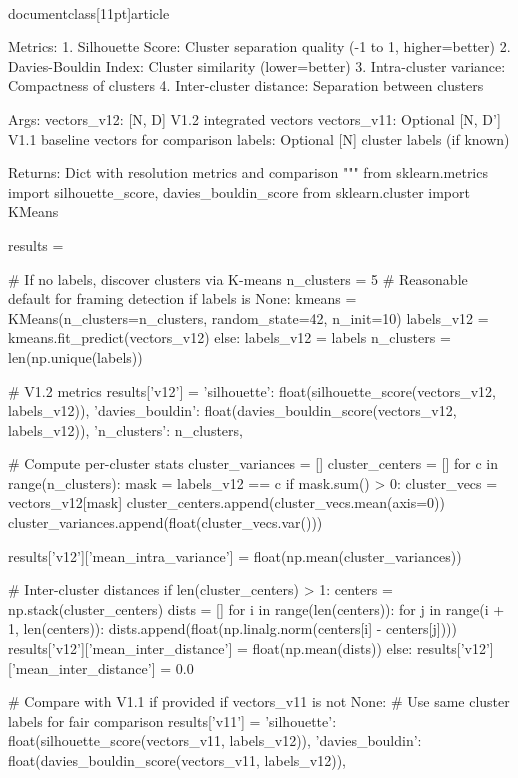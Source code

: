 \\documentclass[11pt]{article}
\begin{document}
\begin{CodeBlock}
    Metrics:
    1. Silhouette Score: Cluster separation quality (-1 to 1, higher=better)
    2. Davies-Bouldin Index: Cluster similarity (lower=better)
    3. Intra-cluster variance: Compactness of clusters
    4. Inter-cluster distance: Separation between clusters

    Args:
        vectors_v12: [N, D] V1.2 integrated vectors
        vectors_v11: Optional [N, D'] V1.1 baseline vectors for comparison
        labels: Optional [N] cluster labels (if known)

    Returns:
        Dict with resolution metrics and comparison
    """
    from sklearn.metrics import silhouette_score, davies_bouldin_score
    from sklearn.cluster import KMeans

    results = {}

    # If no labels, discover clusters via K-means
    n_clusters = 5  # Reasonable default for framing detection
    if labels is None:
        kmeans = KMeans(n_clusters=n_clusters, random_state=42, n_init=10)
        labels_v12 = kmeans.fit_predict(vectors_v12)
    else:
        labels_v12 = labels
        n_clusters = len(np.unique(labels))

    # V1.2 metrics
    results['v12'] = {
        'silhouette': float(silhouette_score(vectors_v12, labels_v12)),
        'davies_bouldin': float(davies_bouldin_score(vectors_v12, labels_v12)),
        'n_clusters': n_clusters,
    }

    # Compute per-cluster stats
    cluster_variances = []
    cluster_centers = []
    for c in range(n_clusters):
        mask = labels_v12 == c
        if mask.sum() > 0:
            cluster_vecs = vectors_v12[mask]
            cluster_centers.append(cluster_vecs.mean(axis=0))
            cluster_variances.append(float(cluster_vecs.var()))

    results['v12']['mean_intra_variance'] = float(np.mean(cluster_variances))

    # Inter-cluster distances
    if len(cluster_centers) > 1:
        centers = np.stack(cluster_centers)
        dists = []
        for i in range(len(centers)):
            for j in range(i + 1, len(centers)):
                dists.append(float(np.linalg.norm(centers[i] - centers[j])))
        results['v12']['mean_inter_distance'] = float(np.mean(dists))
    else:
        results['v12']['mean_inter_distance'] = 0.0

    # Compare with V1.1 if provided
    if vectors_v11 is not None:
        # Use same cluster labels for fair comparison
        results['v11'] = {
            'silhouette': float(silhouette_score(vectors_v11, labels_v12)),
            'davies_bouldin': float(davies_bouldin_score(vectors_v11, labels_v12)),
        }


\end{CodeBlock}
\end{document}
